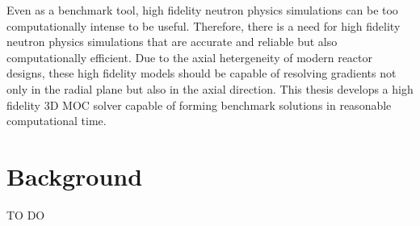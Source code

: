 Even as a benchmark tool, high fidelity neutron physics simulations can be too computationally intense to be useful. Therefore, there is a need for high fidelity neutron physics simulations that are accurate and reliable but also computationally efficient. Due to the axial hetergeneity of modern reactor designs, these high fidelity models should be capable of resolving gradients not only in the radial plane but also in the axial direction. This thesis develops a high fidelity 3D \ac{MOC} solver capable of forming benchmark solutions in reasonable computational time.

\section{Background}
\label{sec:chap1-background}
TO DO